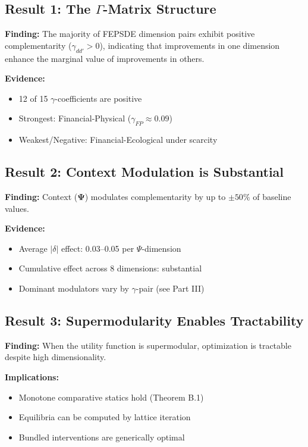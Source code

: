 \subsection{Result 1: The $\Gamma$-Matrix Structure}

\begin{tcolorbox}[colback=green!5!white, colframe=green!75!black]
\textbf{Finding:} The majority of FEPSDE dimension pairs exhibit positive 
complementarity ($\gamma_{dd'} > 0$), indicating that improvements in one 
dimension enhance the marginal value of improvements in others.

\textbf{Evidence:} 
\begin{itemize}[nosep]
    \item 12 of 15 $\gamma$-coefficients are positive
    \item Strongest: Financial-Physical ($\gamma_{FP} \approx 0.09$)
    \item Weakest/Negative: Financial-Ecological under scarcity
\end{itemize}
\end{tcolorbox}

\subsection{Result 2: Context Modulation is Substantial}

\begin{tcolorbox}[colback=green!5!white, colframe=green!75!black]
\textbf{Finding:} Context ($\boldsymbol{\Psi}$) modulates complementarity by 
up to $\pm 50\%$ of baseline values.

\textbf{Evidence:}
\begin{itemize}[nosep]
    \item Average $|\delta|$ effect: 0.03--0.05 per $\Psi$-dimension
    \item Cumulative effect across 8 dimensions: substantial
    \item Dominant modulators vary by $\gamma$-pair (see Part III)
\end{itemize}
\end{tcolorbox}

\subsection{Result 3: Supermodularity Enables Tractability}

\begin{tcolorbox}[colback=green!5!white, colframe=green!75!black]
\textbf{Finding:} When the utility function is supermodular, optimization is 
tractable despite high dimensionality.

\textbf{Implications:}
\begin{itemize}[nosep]
    \item Monotone comparative statics hold (Theorem B.1)
    \item Equilibria can be computed by lattice iteration
    \item Bundled interventions are generically optimal
\end{itemize}
\end{tcolorbox}

